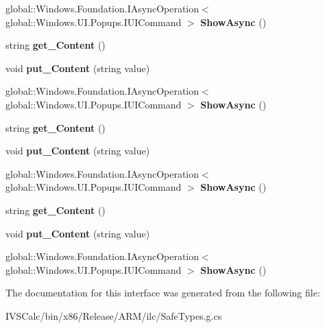 \begin{DoxyCompactItemize}
global\+::\+Windows.\+Foundation.\+I\+Async\+Operation$<$ global\+::\+Windows.\+U\+I.\+Popups.\+I\+U\+I\+Command $>$ {\bfseries Show\+Async} ()
\item 
\mbox{\label{interface_windows_1_1_u_i_1_1_popups_1_1_i_message_dialog_adc3d7f4ba0a8c7bf9235fc45055b6059}} 
string {\bfseries get\+\_\+\+Content} ()
\item 
\mbox{\label{interface_windows_1_1_u_i_1_1_popups_1_1_i_message_dialog_aea604ec3be8c6b6404323ad84c708427}} 
void {\bfseries put\+\_\+\+Content} (string value)
\item 
\mbox{\label{interface_windows_1_1_u_i_1_1_popups_1_1_i_message_dialog_a86ab855938ef9e06722bd7cf897c1c2b}} 
global\+::\+Windows.\+Foundation.\+I\+Async\+Operation$<$ global\+::\+Windows.\+U\+I.\+Popups.\+I\+U\+I\+Command $>$ {\bfseries Show\+Async} ()
\item 
\mbox{\label{interface_windows_1_1_u_i_1_1_popups_1_1_i_message_dialog_adc3d7f4ba0a8c7bf9235fc45055b6059}} 
string {\bfseries get\+\_\+\+Content} ()
\item 
\mbox{\label{interface_windows_1_1_u_i_1_1_popups_1_1_i_message_dialog_aea604ec3be8c6b6404323ad84c708427}} 
void {\bfseries put\+\_\+\+Content} (string value)
\item 
\mbox{\label{interface_windows_1_1_u_i_1_1_popups_1_1_i_message_dialog_a86ab855938ef9e06722bd7cf897c1c2b}} 
global\+::\+Windows.\+Foundation.\+I\+Async\+Operation$<$ global\+::\+Windows.\+U\+I.\+Popups.\+I\+U\+I\+Command $>$ {\bfseries Show\+Async} ()
\item 
\mbox{\label{interface_windows_1_1_u_i_1_1_popups_1_1_i_message_dialog_adc3d7f4ba0a8c7bf9235fc45055b6059}} 
string {\bfseries get\+\_\+\+Content} ()
\item 
\mbox{\label{interface_windows_1_1_u_i_1_1_popups_1_1_i_message_dialog_aea604ec3be8c6b6404323ad84c708427}} 
void {\bfseries put\+\_\+\+Content} (string value)
\item 
\mbox{\label{interface_windows_1_1_u_i_1_1_popups_1_1_i_message_dialog_a86ab855938ef9e06722bd7cf897c1c2b}} 
global\+::\+Windows.\+Foundation.\+I\+Async\+Operation$<$ global\+::\+Windows.\+U\+I.\+Popups.\+I\+U\+I\+Command $>$ {\bfseries Show\+Async} ()
\end{DoxyCompactItemize}


The documentation for this interface was generated from the following file\+:\begin{DoxyCompactItemize}
\item 
I\+V\+S\+Calc/bin/x86/\+Release/\+A\+R\+M/ilc/Safe\+Types.\+g.\+cs\end{DoxyCompactItemize}
